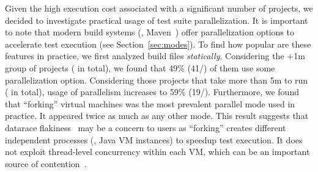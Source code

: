 Given the high execution cost associated with a significant number of
\github{} projects, we decided to investigate practical usage of test
suite parallelization.  It is important to note that modern build
systems (\eg{}, Maven~\cite{maven}) offer parallelization options to
accelerate test execution (see Section~\ref{sec:modes}).  To find how
popular are these features in practice, we first analyzed build files
\emph{statically}.  Considering the +1m group of projects
(\numMedLong{} in total), we found that 49\% (41/\numMedLong{}) of
them use some parallelization option.  Considering those projects that
take more than 5m to run (\numLong{} in total), usage of parallelism
increases to 59\% (19/\numLong{}).  Furthermore, we found that
``forking'' virtual machines was the most prevalent parallel mode used
in practice.  It appeared twice as much as any other mode.  This
result suggests that datarace flakiness~\cite{luo-etal-fse2014} may be
a concern to users as ``forking'' creates different independent
processes (\ie{}, Java VM instances) to speedup test execution.  It
does not exploit thread-level concurrency within each VM, which can be
an important source of
contention~\cite{bell-kaiser-icse2014,bell-etal-esecfse2015}.
 






 	
